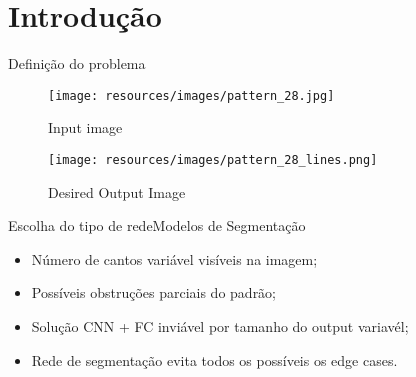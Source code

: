 \section{Introdução}
\begin{frame}{Definição do problema}

     \begin{figure}[ht]
            \begin{minipage}[b]{0.45\linewidth}
                \centering
                \texttt{[image: resources/images/pattern\_28.jpg]}
                \captionsetup{labelformat=empty}
                \caption{Input image}
            \end{minipage}
            \hspace{0.5cm}
            \begin{minipage}[b]{0.45\linewidth}
                \centering
                \texttt{[image: resources/images/pattern\_28\_lines.png]}
                \captionsetup{labelformat=empty}
                \caption{Desired Output Image}
            \end{minipage}
        \end{figure}
    
\end{frame}

\begin{frame}[c]{Escolha do tipo de rede}{Modelos de Segmentação}

  \begin{center}
    \begin{minipage}{0.7\textwidth}
      \begin{itemize}
      \Large
      \item<1-> Número de cantos variável visíveis na imagem;
      \item<1-> Possíveis obstruções parciais do padrão;
      \item<2-> Solução CNN + FC inviável por tamanho do output variavél;
      \item<3-> Rede de segmentação evita todos os possíveis os edge cases.
      \end{itemize}
    \end{minipage}
  \end{center}

    
  \end{frame}


